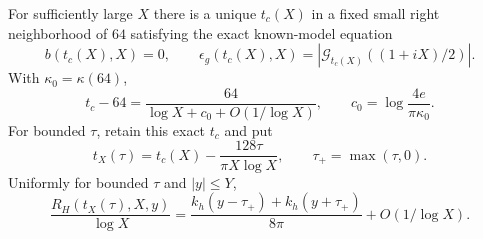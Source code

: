 \begin{corollary}\label{cor:switch-scaling}
For sufficiently large $X$ there is a unique $t_c(X)$ in a fixed small
right neighborhood of $64$ satisfying the exact known-model equation
\begin{equation}
 b(t_c(X),X)=0,\qquad
 \epsilon_g(t_c(X),X)
   =|\mathcal G_{t_c(X)}((1+iX)/2)|.
 \label{eq:linear-exact-center}
\end{equation}
With $\kappa_0=\kappa(64)$,
\begin{equation}
 t_c-64=\frac{64}{\log X+c_0+O(1/\log X)},\qquad
 c_0=\log\frac{4e}{\pi\kappa_0}.
 \label{eq:linear-center-location}
\end{equation}
For bounded $\tau$, retain this exact $t_c$ and put
\begin{equation}
 t_X(\tau)=t_c(X)-\frac{128\tau}{\pi X\log X},\qquad
 \tau_+=\max(\tau,0).
 \label{eq:linear-switch-time}
\end{equation}
Uniformly for bounded $\tau$ and $|y|\le Y$,
\begin{equation}
 \frac{R_H(t_X(\tau),X,y)}{\log X}
 =\frac{k_h(y-\tau_+)+k_h(y+\tau_+)}{8\pi}
       +O(1/\log X).
 \label{eq:linear-switch-law}
\end{equation}
\end{corollary}
